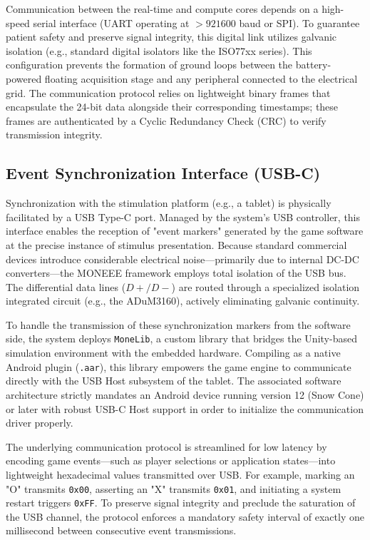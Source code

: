 Communication between the real-time and compute cores depends on a high-speed serial interface (UART operating at $>921600$ baud or SPI). To guarantee patient safety and preserve signal integrity, this digital link utilizes galvanic isolation (e.g., standard digital isolators like the ISO77xx series). This configuration prevents the formation of ground loops between the battery-powered floating acquisition stage and any peripheral connected to the electrical grid. The communication protocol relies on lightweight binary frames that encapsulate the 24-bit data alongside their corresponding timestamps; these frames are authenticated by a Cyclic Redundancy Check (CRC) to verify transmission integrity.


\subsection{Event Synchronization Interface (USB-C)}
\label{subsec:event_interface}

Synchronization with the stimulation platform (e.g., a tablet) is physically facilitated by a USB Type-C port. Managed by the system's USB controller, this interface enables the reception of "event markers" generated by the game software at the precise instance of stimulus presentation. Because standard commercial devices introduce considerable electrical noise—primarily due to internal DC-DC converters—the MONEEE framework employs total isolation of the USB bus. The differential data lines ($D+/D-$) are routed through a specialized isolation integrated circuit (e.g., the ADuM3160), actively eliminating galvanic continuity.

To handle the transmission of these synchronization markers from the software side, the system deploys \texttt{MoneLib}, a custom library that bridges the Unity-based simulation environment with the embedded hardware. Compiling as a native Android plugin (\texttt{.aar}), this library empowers the game engine to communicate directly with the USB Host subsystem of the tablet. The associated software architecture strictly mandates an Android device running version 12 (Snow Cone) or later with robust USB-C Host support in order to initialize the communication driver properly.

The underlying communication protocol is streamlined for low latency by encoding game events—such as player selections or application states—into lightweight hexadecimal values transmitted over USB. For example, marking an "O" transmits \texttt{0x00}, asserting an "X" transmits \texttt{0x01}, and initiating a system restart triggers \texttt{0xFF}. To preserve signal integrity and preclude the saturation of the USB channel, the protocol enforces a mandatory safety interval of exactly one millisecond between consecutive event transmissions.

